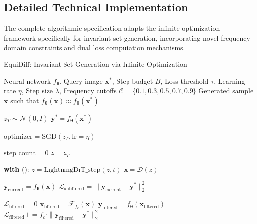 \subsection{Detailed Technical Implementation}

The complete algorithmic specification adapts the infinite optimization framework specifically for invariant set generation, incorporating novel frequency domain constraints and dual loss computation mechanisms.

\begin{algorithm}[H]
\caption{EquiDiff: Invariant Set Generation via Infinite Optimization}
\label{alg:equidiff_invariant_generation}
\begin{algorithmic}[1]
\Require Neural network $f_{\boldsymbol{\theta}}$, Query image $\mathbf{x^*}$, Step budget $B$, Loss threshold $\tau$, Learning rate $\eta$, Step size $\lambda$, Frequency cutoffs $\mathcal{C} = \{0.1, 0.3, 0.5, 0.7, 0.9\}$
\Ensure Generated sample $\mathbf{x}$ such that $f_{\boldsymbol{\theta}}(\mathbf{x}) \approx f_{\boldsymbol{\theta}}(\mathbf{x^*})$

\State $z_T \sim \mathcal{N}(0, I)$ 
\State $\mathbf{y^*} = f_{\boldsymbol{\theta}}(\mathbf{x^*})$ 

\State $\text{optimizer} = \text{SGD}(z_T, \text{lr}=\eta)$ 

\State $\text{step\_count} = 0$ 
 
    \State $z = z_T$ 
    
    \State \textbf{with} (): 
     
        \State $z = \text{LightningDiT\_step}(z, t)$ 
    \EndFor
    \State $\mathbf{x} = \mathcal{D}(z)$ 
    
    \State $\mathbf{y}_{\text{current}} = f_{\boldsymbol{\theta}}(\mathbf{x})$ 
    \State $\mathcal{L}_{\text{unfiltered}} = \|\mathbf{y}_{\text{current}} - \mathbf{y^*}\|_2^2$ 
    
    \State $\mathcal{L}_{\text{filtered}} = 0$ 
     
        \State $\mathbf{x}_{\text{filtered}} = \mathcal{F}_{f_c}(\mathbf{x})$ 
        \State $\mathbf{y}_{\text{filtered}} = f_{\boldsymbol{\theta}}(\mathbf{x}_{\text{filtered}})$ 
        \State $\mathcal{L}_{\text{filtered}} += f_c \cdot \|\mathbf{y}_{\text{filtered}} - \mathbf{y^*}\|_2^2$ 
    \EndFor
    

\end{algorithmic}
\end{algorithm}
